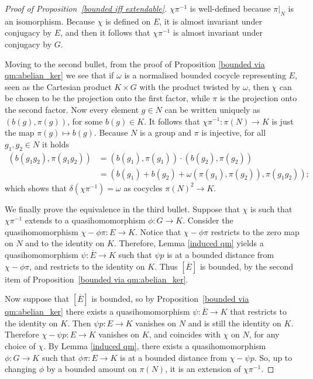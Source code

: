 \documentclass[svgnames]{amsart}
\theoremstyle{plain}
\theoremstyle{definition}
\begin{document}
\begin{proof}[Proof of Proposition~\ref{bounded iff extendable}]
    $\chi \pi^{-1}$ is well-defined because $\pi|_N$ is an isomorphism. Because $\chi$ is defined on $E$, it is almost invariant under conjugacy by $E$, and then it follows that $\chi \pi^{-1}$ is almost invariant under conjugacy by $G$. 
    
    Moving to the second bullet, from the proof of Proposition \ref{bounded via qm:abelian_ker} we see that if $\omega$ is a normalised bounded cocycle representing $E$, seen as the Cartesian product $K \times G$ with the product twisted by $\omega$, then $\chi$ can be chosen to be the projection onto the first factor, while $\pi$ is the projection onto the second factor. Now every element $g \in N$ can be written uniquely as $(b(g), \pi(g))$, for some $b(g) \in K$. It follows that $\chi \pi^{-1} \colon \pi(N) \to K$ is just the map $\pi(g) \mapsto b(g)$. Because $N$ is a group and $\pi$ is injective, for all $g_1, g_2 \in N$ it holds
    \begin{align*}
        (b(g_1g_2), \pi(g_1g_2)) &= (b(g_1), \pi(g_1)) \cdot (b(g_2), \pi(g_2)) \\
        &= (b(g_1) + b(g_2) + \omega(\pi(g_1), \pi(g_2)), \pi(g_1g_2));
    \end{align*}
    which shows that $\delta (\chi \pi^{-1}) = \omega$ as cocycles $\pi(N)^2 \to K$.

    We finally prove the equivalence in the third bullet. Suppose that $\chi$ is such that $\chi \pi^{-1}$ extends to a quasihomomorphism $\phi \colon G \to K$. Consider the quasihomomorphism $\chi - \phi \pi \colon E \to K$. Notice that $\chi - \phi \pi$ restricts to the zero map on $N$ and to the identity on $K$. Therefore, Lemma \ref{induced qm} yields a quasihomomorphism $\psi \colon \overline{E} \to K$ such that $\psi p$ is at a bounded distance from $\chi - \phi \pi$, and restricts to the identity on $K$. Thus $[\overline{E}]$ is bounded, by the second item of Proposition~\ref{bounded via qm:abelian_ker}.

    Now suppose that $[\overline{E}]$ is bounded, so by Proposition~\ref{bounded via qm:abelian_ker} there exists a quasihomomorphism $\psi \colon \overline{E} \to K$ that restricts to the identity on $K$. Then $\psi p \colon E \to K$ vanishes on $N$ and is still the identity on $K$. Therefore $\chi - \psi p \colon E \to K$ vanishes on $K$, and coincides with $\chi$ on $N$, for any choice of $\chi$. By Lemma \ref{induced qm}, there exists a quasihomomorphism $\phi \colon G \to K$ such that $\phi \pi \colon E \to K$ is at a bounded distance from $\chi - \psi p$. So, up to changing $\phi$ by a bounded amount on $\pi(N)$, it is an extension of $\chi \pi^{-1}$.
\end{proof}
\end{document}
